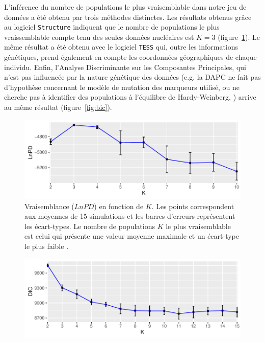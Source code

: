 \documentclass[a4paper,12pt,twoside]{article}\usepackage[]{graphicx}\usepackage[]{color}
\makeatletter
\def\maxwidth{ %
  \ifdim\Gin@nat@width>\linewidth
    \linewidth
  \else
    \Gin@nat@width
  \fi
}
\makeatother
\begin{document}
\begin {bibunit} [newbst]
L'inférence du nombre de populations le plus vraisemblable dans notre jeu de données a été obtenu par trois méthodes distinctes. Les résultats obtenus grâce au logiciel \texttt{Structure} \citep{pritchard2000} indiquent que le nombre de populations le plus vraissemblable compte tenu des seules données nucléaires est $K=3$ (figure~\ref{fig:lnpd}). Le même résultat a été obtenu avec le logiciel \texttt{TESS} \citep[][figure~\ref{fig:dic}]{durand2009} qui, outre les informations génétiques, prend également en compte les coordonnées géographiques de chaque individu. 
Enfin, l'Analyse Discriminante sur les Composantes Principales, qui n'est pas influencée par la nature génétique des données (e.g. la DAPC ne fait pas d'hypothèse concernant le modèle de mutation des marqueurs utilisé, ou ne cherche pas à identifier des populations à l'équilibre de Hardy-Weinberg, \citealp{jombart2008}) arrive au même résultat (figure~\ref{fig:bic}).

\begin{figure}[htpb]

{\centering \includegraphics[width=\maxwidth]{figure/lnpd-1} 

}

\caption[Vraisemblance ($LnPD$) en fonction de $K$.]{Vraisemblance ($LnPD$) en fonction de $K$. Les points correspondent aux moyennes de 15 simulations et les barres d'erreurs représentent les écart-types. Le nombre de populations $K$ le plus vraisemblable est celui qui présente une valeur moyenne maximale et un écart-type le plus faible \citep{pritchard2000}.}\label{fig:lnpd}
\end{figure}



\begin{figure}[htpb]

{\centering \includegraphics[width=\maxwidth]{figure/dic-1} 

}
\end{figure}
\end{bibunit}
\end{document}
